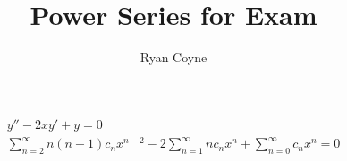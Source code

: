 \documentclass[12pt]{article}
\begin{document}
\title{Power Series for Exam}
    \author{Ryan Coyne}
    \date{}
    \maketitle

\begin{gather*}
  y''-2xy'+y=0\\
  \sum_{n=2}^\infty n(n-1)c_nx^{n-2} - 2\sum_{n=1}^\infty nc_nx^n + \sum_{n=0}^\infty c_nx^n = 0
\end{gather*}
\end{document}
